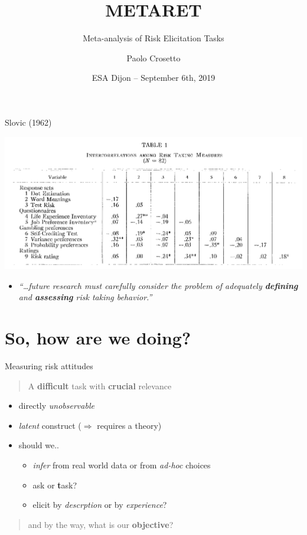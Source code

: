 \documentclass[
  ignorenonframetext,
]{beamer}
\title{METARET}
\subtitle{Meta-analysis of Risk Elicitation Tasks}
\author{Paolo Crosetto}
\date{ESA Dijon -- September 6th, 2019}
\providecommand{\tightlist}{%
  \setlength{\itemsep}{0pt}\setlength{\parskip}{0pt}}
\begin{document}
\frame{\titlepage}

\begin{frame}{Slovic (1962)}
\protect\hypertarget{slovic-1962}{}

\includegraphics[width=8.33333in,height=\textheight]{Slovic1962.png}

\begin{itemize}[<+->]
\tightlist
\item
  \emph{``\ldots future research must carefully consider the problem of
  adequately \textbf{defining} and \textbf{assessing} risk taking
  behavior.''}
\end{itemize}

\end{frame}

\hypertarget{so-how-are-we-doing}{%
\section{So, how are we doing?}\label{so-how-are-we-doing}}

\begin{frame}{Measuring risk attitudes}
\protect\hypertarget{measuring-risk-attitudes}{}

\begin{quote}
A \textbf{difficult} task with \textbf{crucial} relevance
\end{quote}

\begin{itemize}
\tightlist
\item
  directly \emph{unobservable}
\item
  \emph{latent} construct (\(\Rightarrow\) requires a theory)
\item
  should we..

  \begin{itemize}
  \tightlist
  \item
    \emph{infer} from real world data or from \emph{ad-hoc} choices
  \item
    ask or \textbf{t}ask?
  \item
    elicit by \emph{descrption} or by \emph{experience}?
  \end{itemize}
\end{itemize}

\begin{quote}
and by the way, what is our \textbf{objective}?
\end{quote}

\end{frame}
\end{document}
